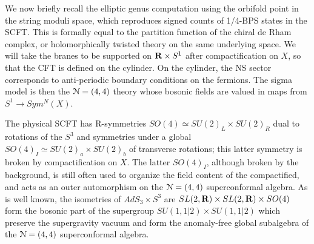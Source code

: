 \documentclass[../main.tex]{subfiles}
\begin{document}
We now briefly recall the elliptic genus computation using the orbifold point in the string moduli space, which reproduces signed counts of 1/4-BPS states in the SCFT. This is formally equal to the partition function of the chiral de Rham complex, or holomorphically twisted theory on the same underlying space. We will take the branes to be supported on $\mathbf{R} \times S^1$ after compactification on $X$, so that the CFT is defined on the cylinder. On the cylinder, the NS sector corresponds to anti-periodic boundary conditions on the fermions. The sigma model is then the $\mathcal N = (4,4)$ theory whose bosonic fields are valued in maps from $S^1 \rightarrow Sym^N(X)$.  

The physical SCFT has R-symmetries $SO(4) \simeq SU(2)_L \times SU(2)_R$ dual to rotations of the $S^3$ and symmetries under a global $SO(4)_I \simeq SU(2)_a \times SU(2)_b$ of transverse rotations; this latter symmetry is broken by compactification on $X$. The latter $SO(4)_I$, although broken by the background, is still often used to organize the field content of the compactified, and acts as an outer automorphism on the $\mathcal N=(4, 4)$ superconformal algebra. As is well known, the isometries of $AdS_3 \times S^3$ are $SL(2, \mathbf{R}) \times SL(2, \mathbf{R}) \times SO(4)$ form the bosonic part of the supergroup $SU(1,1|2) \times SU(1,1|2)$ which preserve the supergravity vacuum and form the anomaly-free global subalgebra of the $\mathcal N= (4,4)$ superconformal algebra.

\end{document}
